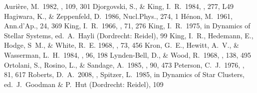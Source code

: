 \documentclass[11pt,twoside]{article}  %
\begin{document}
%
%
%

\begin{references}

 Auri\`ere, M.\  1982, \aap, 109, 301
 Djorgovski, S., \& King, I.\ R.\  1984, \apj, 277, L49
 Hagiwara, K., \& Zeppenfeld, D.\  1986, Nucl.Phys., 274, 1
 H\'enon, M.\  1961, Ann.d'Ap., 24, 369
 King, I.~R.\  1966, \aj, 71, 276
 King, I.~R.\  1975, in Dynamics of Stellar Systems, ed.\ A.\ Hayli
    (Dordrecht: Reidel), 99
 King, I.\ R., Hedemann, E., Hodge, S\ M., \& White, R.~E.
    1968, \aj, 73, 456
 Kron, G.~E., Hewitt, A.~V., \& Wasserman, L.~H.\
    1984, \pasp, 96, 198
 Lynden-Bell, D., \& Wood, R.\  1968, \mnras, 138, 495
 Ortolani, S., Rosino, L., \& Sandage, A.\  1985, \aj, 90, 473
 Peterson, C.~J.\  1976, \aj, 81, 617
 Roberts, D.~A.\ 2008, \adassxvii, 
\reference Spitzer, L.\  1985, in Dynamics of Star Clusters,
    ed.~J.~Goodman \& P.~Hut (Dordrecht: Reidel), 109
    
\end{references}

\end{document}
